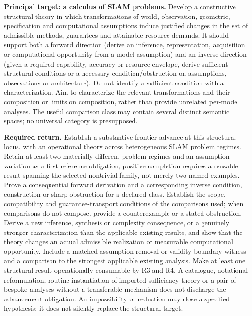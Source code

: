 \documentclass[11pt,letterpaper]{article}
\begin{document}
\textbf{Principal target: a calculus of SLAM problems.} Develop a constructive structural theory in which transformations of world, observation, geometric, specification and computational assumptions induce justified changes in the set of admissible methods, guarantees and attainable resource demands. It should support both a forward direction (derive an inference, representation, acquisition or computational opportunity from a model assumption) and an inverse direction (given a required capability, accuracy or resource envelope, derive sufficient structural conditions or a necessary condition/obstruction on assumptions, observations or architecture). Do not identify a sufficient condition with a characterization. Aim to characterize the relevant transformations and their composition or limits on composition, rather than provide unrelated per-model analyses. The useful comparison class may contain several distinct semantic spaces; no universal category is presupposed.

\textbf{Required return.} Establish a substantive frontier advance at this structural locus, with an operational theory across heterogeneous SLAM problem regimes. Retain at least two materially different problem regimes and an assumption variation as a first reference obligation; positive completion requires a reusable result spanning the selected nontrivial family, not merely two named examples. Prove a consequential forward derivation and a corresponding inverse condition, construction or sharp obstruction for a declared class. Establish the scope, compatibility and guarantee-transport conditions of the comparisons used; when comparisons do not compose, provide a counterexample or a stated obstruction. Derive a new inference, synthesis or complexity consequence, or a genuinely stronger characterization than the applicable existing results, and show that the theory changes an actual admissible realization or measurable computational opportunity. Include a matched assumption-removal or validity-boundary witness and a comparison to the strongest applicable existing analysis. Make at least one structural result operationally consumable by R3 and R4. A catalogue, notational reformulation, routine instantiation of imported sufficiency theory or a pair of bespoke analyses without a transferable mechanism does not discharge the advancement obligation. An impossibility or reduction may close a specified hypothesis; it does not silently replace the structural target.
\end{document}
